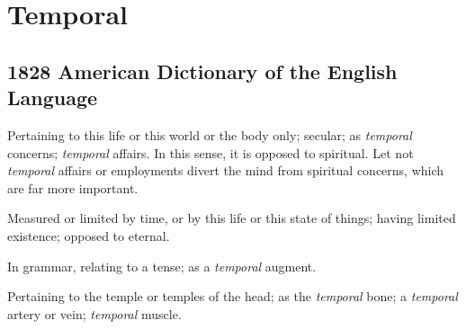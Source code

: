 \section{Temporal}
	\label{TEMPORAL}
	

\subsection{1828 American Dictionary of the English Language} %
	\label{TEMPORAL-1828}

	\begin{compactitem}
		\item[1] Pertaining to this life or this world or the body only; secular; as \textit{temporal} concerns; \textit{temporal} affairs. In this sense, it is opposed to spiritual. Let not \textit{temporal} affairs or employments divert the mind from spiritual concerns, which are far more important.
		\item[2] Measured or limited by time, or by this life or this state of things; having limited existence; opposed to eternal.
		\item[3] In grammar, relating to a tense; as a \textit{temporal} augment.
		\item[4] Pertaining to the temple or temples of the head; as the \textit{temporal} bone; a \textit{temporal} artery or vein; \textit{temporal} muscle.
	\end{compactitem}




